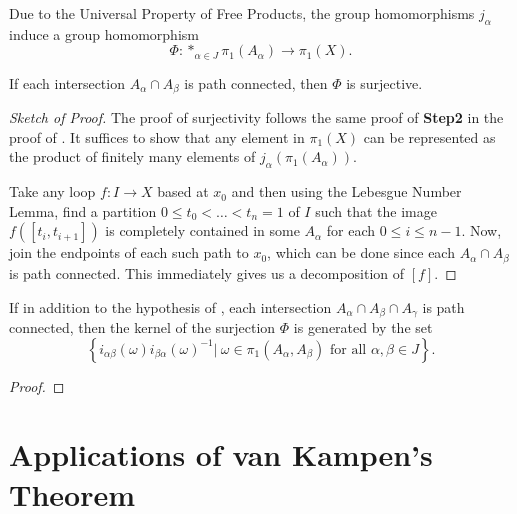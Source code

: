 Due to the Universal Property of Free Products, the group homomorphisms $j_\alpha$ induce a group homomorphism 
\[
    \Phi:\ast_{\alpha\in J}\pi_1(A_\alpha)\to\pi_1(X).
\]

\begin{proposition}
    If each intersection $A_\alpha\cap A_\beta$ is path connected, then $\Phi$ is surjective.
\end{proposition}
\begin{proof}[Sketch of Proof]
    The proof of surjectivity follows the same proof of \textbf{Step2} in the proof of . It suffices to show that any element in $\pi_1(X)$ can be represented as the product of finitely many elements of $j_\alpha\left(\pi_1(A_\alpha)\right)$. 

    Take any loop $f: I\to X$ based at $x_0$ and then using the Lebesgue Number Lemma, find a partition $0\le t_0 < \dots < t_n = 1$ of $I$ such that the image $f([t_i, t_{i + 1}])$ is completely contained in some $A_\alpha$ for each $0\le i\le n - 1$. Now, join the endpoints of each such path to $x_0$, which can be done since each $A_\alpha\cap A_\beta$ is path connected. This immediately gives us a decomposition of $[f]$.
\end{proof}

\begin{proposition}
    If in addition to the hypothesis of , each intersection $A_\alpha\cap A_\beta\cap A_\gamma$ is path connected, then the kernel of the surjection $\Phi$ is generated by the set 
    \begin{equation*}
        \left\{i_{\alpha\beta}(\omega)i_{\beta\alpha}(\omega)^{-1}\big\vert~\omega\in\pi_1(A_\alpha,A_\beta)\text{ for all }\alpha,\beta\in J\right\}.
    \end{equation*}
\end{proposition}
\begin{proof}
\end{proof}

\section{Applications of van Kampen's Theorem}


